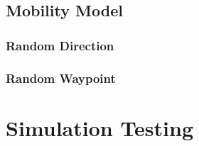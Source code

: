 \subsection{Mobility Model}

\subsubsection{Random Direction}

\subsubsection{Random Waypoint}

\section{Simulation Testing}